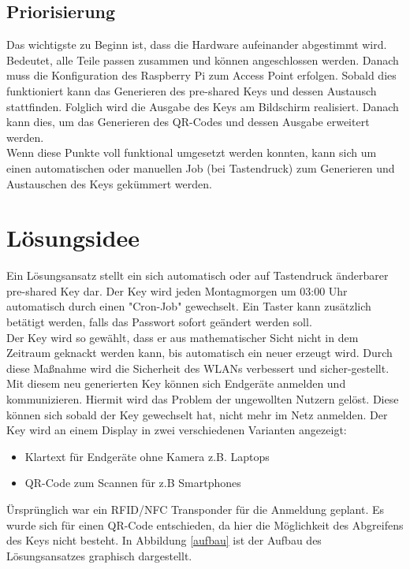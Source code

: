 \documentclass[a4paper,11pt,singlespacing]{article}
\begin{document}
    		\subsection{Priorisierung}
            	Das wichtigste zu Beginn ist, dass die Hardware aufeinander abgestimmt wird. Bedeutet, alle Teile passen zusammen und können angeschlossen werden.
            	Danach muss die Konfiguration des Raspberry Pi zum Access Point erfolgen. Sobald dies funktioniert kann das Generieren des pre-shared Keys und dessen Austausch stattfinden. Folglich wird die Ausgabe des Keys am Bildschirm realisiert. Danach kann dies, um das Generieren des QR-Codes und dessen Ausgabe erweitert werden.\\
            	Wenn diese Punkte voll funktional umgesetzt werden konnten, kann sich um einen automatischen oder manuellen Job (bei Tastendruck) zum Generieren und Austauschen des Keys gekümmert werden.
    	
	\section{Lösungsidee}
    	Ein Lösungsansatz stellt ein sich automatisch oder auf Tastendruck änderbarer pre-shared Key dar. Der Key wird jeden Montagmorgen um 03:00 Uhr automatisch durch einen "Cron-Job" gewechselt. Ein Taster kann zusätzlich betätigt werden, falls das Passwort sofort geändert werden soll. \\
		Der Key wird so gewählt, dass er aus mathematischer Sicht nicht in dem Zeitraum geknackt werden kann, bis automatisch ein neuer erzeugt wird. Durch diese Maßnahme wird die Sicherheit des WLANs verbessert und sicher-gestellt.
		Mit diesem neu generierten Key können sich Endgeräte anmelden und kommunizieren. Hiermit wird das Problem der ungewollten Nutzern gelöst. Diese können sich sobald der Key gewechselt hat, nicht mehr im Netz anmelden. Der Key wird an einem Display in zwei verschiedenen Varianten angezeigt:
		\begin{itemize}
			\item Klartext für Endgeräte ohne Kamera z.B. Laptops
			\item QR-Code zum Scannen für z.B Smartphones
		\end{itemize}
		
		Ürsprünglich war ein RFID/NFC Transponder für die Anmeldung geplant. Es wurde sich für einen QR-Code entschieden, da hier die Möglichkeit des Abgreifens des Keys nicht besteht. In Abbildung  \ref{aufbau} ist der Aufbau des Lösungsansatzes graphisch dargestellt. 
\end{document}
